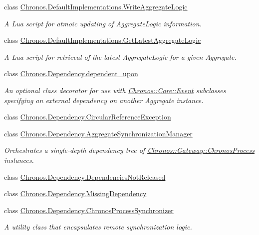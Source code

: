 \begin{DoxyCompactItemize}
class \hyperlink{classChronos_1_1DefaultImplementations_1_1WriteAggregateLogic}{Chronos.\+Default\+Implementations.\+Write\+Aggregate\+Logic}
\begin{DoxyCompactList}\small\item\em A Lua script for atmoic updating of Aggregate\+Logic information. \end{DoxyCompactList}\item 
class \hyperlink{classChronos_1_1DefaultImplementations_1_1GetLatestAggregateLogic}{Chronos.\+Default\+Implementations.\+Get\+Latest\+Aggregate\+Logic}
\begin{DoxyCompactList}\small\item\em A Lua script for retrieval of the latest Aggregate\+Logic for a given Aggregate. \end{DoxyCompactList}\item 
class \hyperlink{classChronos_1_1Dependency_1_1dependent__upon}{Chronos.\+Dependency.\+dependent\+\_\+upon}
\begin{DoxyCompactList}\small\item\em An optional class decorator for use with \hyperlink{classChronos_1_1Core_1_1Event}{Chronos\+::\+Core\+::\+Event} subclasses specifying an external dependency on another Aggregate instance. \end{DoxyCompactList}\item 
class \hyperlink{classChronos_1_1Dependency_1_1CircularReferenceException}{Chronos.\+Dependency.\+Circular\+Reference\+Exception}
\item 
class \hyperlink{classChronos_1_1Dependency_1_1AggregateSynchronizationManager}{Chronos.\+Dependency.\+Aggregate\+Synchronization\+Manager}
\begin{DoxyCompactList}\small\item\em Orchestrates a single-\/depth dependency tree of \hyperlink{classChronos_1_1Gateway_1_1ChronosProcess}{Chronos\+::\+Gateway\+::\+Chronos\+Process} instances. \end{DoxyCompactList}\item 
class \hyperlink{classChronos_1_1Dependency_1_1DependenciesNotReleased}{Chronos.\+Dependency.\+Dependencies\+Not\+Released}
\item 
class \hyperlink{classChronos_1_1Dependency_1_1MissingDependency}{Chronos.\+Dependency.\+Missing\+Dependency}
\item 
class \hyperlink{classChronos_1_1Dependency_1_1ChronosProcessSynchronizer}{Chronos.\+Dependency.\+Chronos\+Process\+Synchronizer}
\begin{DoxyCompactList}\small\item\em A utility class that encapsulates remote synchronization logic. \end{DoxyCompactList}\item 

\end{DoxyCompactItemize}
